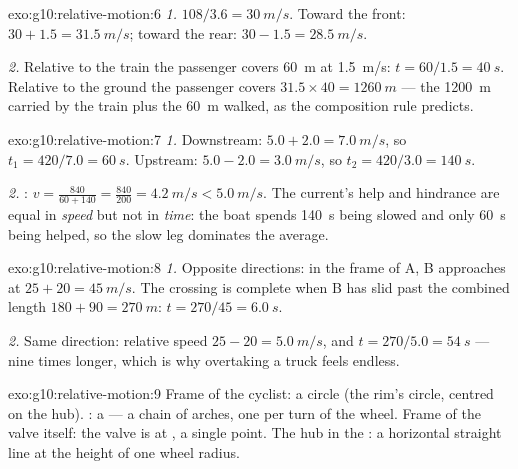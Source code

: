 \begin{solution}{exo:g10:relative-motion:6}
\emph{1.} $108/3.6 = \qty{30}{m/s}$. Toward the front:
$30 + 1.5 = \qty{31.5}{m/s}$; toward the rear:
$30 - 1.5 = \qty{28.5}{m/s}$.

\emph{2.} Relative to the train the passenger covers \qty{60}{m} at
\qty{1.5}{m/s}: $t = 60/1.5 = \qty{40}{s}$. Relative to the ground the
passenger covers $31.5 \times 40 = \qty{1260}{m}$ --- the \qty{1200}{m}
carried by the train plus the \qty{60}{m} walked, as the composition
rule predicts.
\end{solution}

\begin{solution}{exo:g10:relative-motion:7}
\emph{1.} Downstream: $5.0 + 2.0 = \qty{7.0}{m/s}$, so
$t_1 = 420/7.0 = \qty{60}{s}$. Upstream: $5.0 - 2.0 = \qty{3.0}{m/s}$,
so $t_2 = 420/3.0 = \qty{140}{s}$.

\emph{2.} : $v = \frac{840}{60 + 140}
= \frac{840}{200} = \qty{4.2}{m/s} < \qty{5.0}{m/s}$. The current's
help and hindrance are equal in \emph{speed} but not in \emph{time}:
the boat spends \qty{140}{s} being slowed and only \qty{60}{s} being
helped, so the slow leg dominates the average.
\end{solution}

\begin{solution}{exo:g10:relative-motion:8}
\emph{1.} Opposite directions: in the frame of A, B approaches at
$25 + 20 = \qty{45}{m/s}$. The crossing is complete when B has slid
past the combined length $180 + 90 = \qty{270}{m}$:
$t = 270/45 = \qty{6.0}{s}$.

\emph{2.} Same direction: relative speed $25 - 20 = \qty{5.0}{m/s}$,
and $t = 270/5.0 = \qty{54}{s}$ --- nine times longer, which is why
overtaking a truck feels endless.
\end{solution}

\begin{solution}{exo:g10:relative-motion:9}
Frame of the cyclist: a circle (the rim's circle, centred on the hub).
: a  --- a chain of arches, one per turn of the
wheel. Frame of the valve itself: the valve is at , a single point.
The hub in the : a horizontal straight line at the height
of one wheel radius.
\end{solution}

